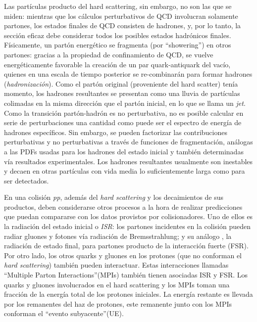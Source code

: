 Las partículas producto del hard scattering, sin embargo, no son las que se miden: mientras que los cálculos perturbativos de QCD involucran solamente partones, los estados finales de QCD consisten de hadrones, y, por lo tanto, la sección eficaz debe considerar todos los posibles estados hadrónicos finales. Físicamente, un partón energético se fragmenta (por ``showering'') en otros partones: gracias a la propiedad de confinamiento de QCD, se vuelve energéticamente favorable la creación de un par quark-antiquark del vacío, quienes en una escala de tiempo posterior se re-combinarán para formar hadrones (\emph{hadronización}). Como el partón original (proveniente del hard scatter) tenía momento, los hadrones resultantes se presentan como una lluvia de partículas colimadas en la misma dirección que el partón inicial, en lo que se llama un \emph{jet}. Como la transición partón-hadrón es no perturbativa, no es posible calcular en serie de perturbaciones una cantidad como puede ser el espectro de energía de hadrones específicos. Sin embargo, se pueden factorizar las contribuciones perturbativas y no perturbativas a través de funciones de fragmentación, análogas a las PDFs usadas para los hadrones del estado inicial y también determinadas vía resultados experimentales\cite{ParticleDataGroup}. Los hadrones resultantes usualmente son inestables y decaen en otras partículas con vida media lo suficientemente larga como para ser detectados. 

En una colisión \emph{pp}, además del \emph{hard scattering} y los decaimientos de sus productos, deben considerarse otros procesos a la hora de realizar predicciones que puedan compararse con los datos provistos por colisionadores. Uno de ellos es la radiación del estado inicial o \emph{ISR}: los partones incidentes en la colisión pueden radiar gluones y fotones vía radiación de Bremsstrahlung; y su análogo , la radiación de estado final, para partones producto de la interacción fuerte (FSR). Por otro lado, los otros quarks y gluones en los protones (que no conforman el \emph{hard scattering}) también pueden interactuar. Estas interacciones llamadas ``Multiple Parton Interactions''(MPIs) también tienen asociadas ISR y FSR.
Los quarks y gluones involucrados en el hard scattering y los MPIs toman una fracción de la energía total de los protones iniciales. La energía restante es llevada por los remanentes del haz de protones, este remanente junto con los MPIs conforman el ``evento subyacente''(UE).


